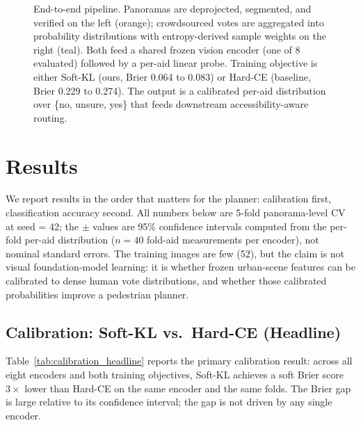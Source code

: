 \documentclass[conference]{IEEEtran}
\begin{document}
\begin{figure}[!t]
{\begin{tikzpicture}[node distance=5mm, font=\normalsize, >=Stealth]
\end{tikzpicture}%
}
\caption{End-to-end pipeline. Panoramas are deprojected, segmented, and verified on the left (orange); crowdsourced votes are aggregated into probability distributions with entropy-derived sample weights on the right (teal). Both feed a shared frozen vision encoder (one of 8 evaluated) followed by a per-aid linear probe. Training objective is either Soft-KL (ours, Brier 0.064 to 0.083) or Hard-CE (baseline, Brier 0.229 to 0.274). The output is a calibrated per-aid distribution over \{no, unsure, yes\} that feeds downstream accessibility-aware routing.}
\label{fig:pipeline}
\end{figure}

\section{Results}
\label{sec:results}

We report results in the order that matters for the planner: calibration first, classification accuracy second. All numbers below are 5-fold panorama-level CV at seed = 42; the $\pm$ values are 95\% confidence intervals computed from the per-fold per-aid distribution ($n=40$ fold-aid measurements per encoder), not nominal standard errors. The training images are few (52), but the claim is not visual foundation-model learning: it is whether frozen urban-scene features can be calibrated to dense human vote distributions, and whether those calibrated probabilities improve a pedestrian planner.

\subsection{Calibration: Soft-KL vs.\ Hard-CE (Headline)}
\label{sec:calibration_headline}

Table~\ref{tab:calibration_headline} reports the primary calibration result: across all eight encoders and both training objectives, Soft-KL achieves a soft Brier score $3\times$ lower than Hard-CE on the same encoder and the same folds. The Brier gap is large relative to its confidence interval; the gap is not driven by any single encoder.
\end{document}
